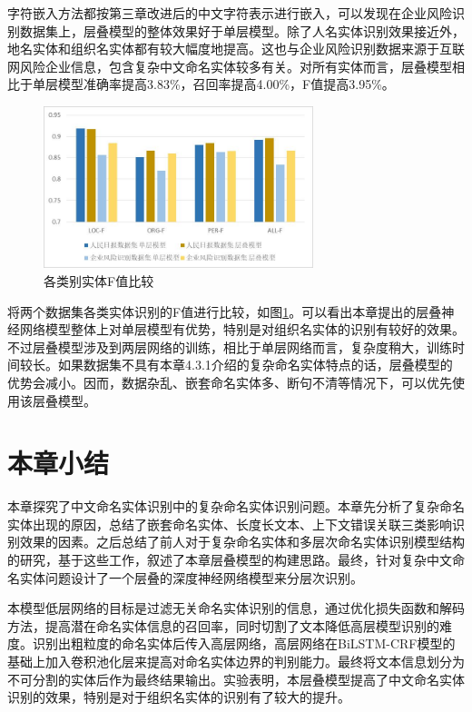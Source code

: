 \documentclass[winfonts,master,oneside,nobackinfo]{njuthesis}
\begin{document}
字符嵌入方法都按第三章改进后的中文字符表示进行嵌入，可以发现在企业风险识别数据集上，层叠模型的整体效果好于单层模型。除了人名实体识别效果接近外，地名实体和组织名实体都有较大幅度地提高。这也与企业风险识别数据来源于互联网风险企业信息，包含复杂中文命名实体较多有关。对所有实体而言，层叠模型相比于单层模型准确率提高3.83\%，召回率提高4.00\%，F值提高3.95\%。


\begin{figure}[h]
\centering
\includegraphics[width=0.7\textwidth]{./figure/层叠模型F值比较.jpg}
\caption{各类别实体F值比较}
\label{compare}
\end{figure}

将两个数据集各类实体识别的F值进行比较，如图\ref{compare}。可以看出本章提出的层叠神经网络模型整体上对单层模型有优势，特别是对组织名实体的识别有较好的效果。不过层叠模型涉及到两层网络的训练，相比于单层网络而言，复杂度稍大，训练时间较长。如果数据集不具有本章4.3.1介绍的复杂命名实体特点的话，层叠模型的优势会减小。因而，数据杂乱、嵌套命名实体多、断句不清等情况下，可以优先使用该层叠模型。


\section{本章小结}

本章探究了中文命名实体识别中的复杂命名实体识别问题。本章先分析了复杂命名实体出现的原因，总结了嵌套命名实体、长度长文本、上下文错误关联三类影响识别效果的因素。之后总结了前人对于复杂命名实体和多层次命名实体识别模型结构的研究，基于这些工作，叙述了本章层叠模型的构建思路。最终，针对复杂中文命名实体问题设计了一个层叠的深度神经网络模型来分层次识别。

本模型低层网络的目标是过滤无关命名实体识别的信息，通过优化损失函数和解码方法，提高潜在命名实体信息的召回率，同时切割了文本降低高层模型识别的难度。识别出粗粒度的命名实体后传入高层网络，高层网络在BiLSTM-CRF模型的基础上加入卷积池化层来提高对命名实体边界的判别能力。最终将文本信息划分为不可分割的实体后作为最终结果输出。实验表明，本层叠模型提高了中文命名实体识别的效果，特别是对于组织名实体的识别有了较大的提升。
\end{document}
